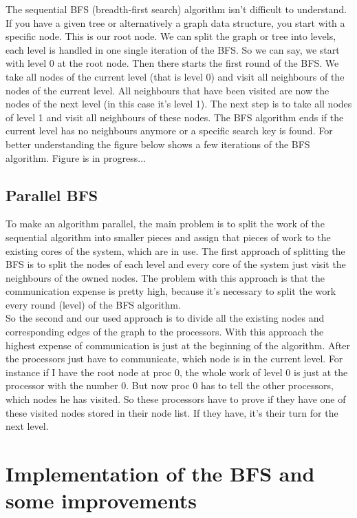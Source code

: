 \documentclass[12pt,a4paper]{article}
\begin{document}
The sequential BFS (breadth-first search) algorithm isn't difficult to understand. If you have a given tree or alternatively a graph data structure, you start with a specific node. This is our root node. We can split the graph or tree into levels, each level is handled in one single iteration of the BFS. So we can say, we start with level 0 at the root node.
Then there starts the first round of the BFS. We take all nodes of the current level (that is level 0) and visit all neighbours of the nodes of the current level. All neighbours that have been visited are now the nodes of the next level (in this case it's level 1). The next step is to take all nodes of level 1 and visit all neighbours of these nodes. The BFS algorithm ends if the current level has no neighbours anymore or a specific search key is found. For better understanding the figure below shows a few iterations of the BFS algorithm. Figure is in progress...

\subsection{Parallel BFS}
\label{sec:parallel-bfs}

To make an algorithm parallel, the main problem is to split the work of the sequential algorithm into smaller pieces and assign that pieces of work to the existing cores of the system, which are in use. 
The first approach of splitting the BFS is to split the nodes of each level and every core of the system just visit the neighbours of the owned nodes. The problem with this approach is that the communication expense is pretty high, because it's necessary to split the work every round (level) of the BFS algorithm.\\
So the second and our used approach is to divide all the existing nodes and corresponding edges of the graph to the processors. With this approach the highest expense of communication is just at the beginning of the algorithm. After the processors just have to communicate, which node is in the current level. For instance if I have the root node at proc 0, the whole work of level 0 is just at the processor with the number 0. But now proc 0 has to tell the other processors, which nodes he has visited. So these processors have to prove if they have one of these visited nodes stored in their node list. If they have, it's their turn for the next level.

\section{Implementation of the BFS and some improvements}
\label{sec:implementations}
\end{document}
